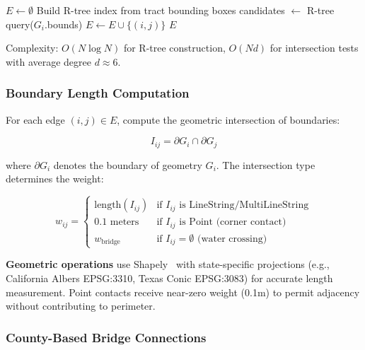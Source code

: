 \begin{algorithmic}[1]
    \State $E \gets \emptyset$
    \State Build R-tree index from tract bounding boxes
        \State candidates $\gets$ R-tree query($G_i$.bounds)
                \State $E \gets E \cup \{(i, j)\}$
            \EndIf
        \EndFor
    \EndFor
    \State \Return $E$
\EndFunction
\end{algorithmic}

Complexity: $O(N \log N)$ for R-tree construction, $O(Nd)$ for intersection tests with average degree $d \approx 6$.

\subsubsection{Boundary Length Computation}

For each edge $(i,j) \in E$, compute the geometric intersection of boundaries:

\begin{equation}
    I_{ij} = \partial G_i \cap \partial G_j
\end{equation}

where $\partial G_i$ denotes the boundary of geometry $G_i$. The intersection type determines the weight:

\begin{equation}
    w_{ij} = \begin{cases}
        \text{length}(I_{ij}) & \text{if } I_{ij} \text{ is LineString/MultiLineString} \\
        0.1 \text{ meters} & \text{if } I_{ij} \text{ is Point (corner contact)} \\
        w_{\text{bridge}} & \text{if } I_{ij} = \emptyset \text{ (water crossing)}
    \end{cases}
\end{equation}

\textbf{Geometric operations} use Shapely~\cite{shapely} with state-specific projections (e.g., California Albers EPSG:3310, Texas Conic EPSG:3083) for accurate length measurement. Point contacts receive near-zero weight (0.1m) to permit adjacency without contributing to perimeter.

\subsubsection{County-Based Bridge Connections}


